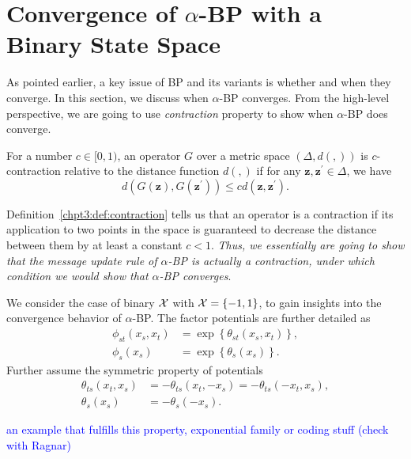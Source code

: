 \section{Convergence of $\alpha$-BP with a Binary State Space}\label{chpt3:sec:cnvg-thm}

As pointed earlier, a key issue of BP and its variants is whether and when they converge. In this section, we discuss when $\alpha$-BP converges. 
From the high-level perspective, we are going to use \textit{contraction} property to show when $\alpha$-BP does converge.
\begin{definition}\label{chpt3:def:contraction}
  For a number $c \in [0,1)$, an operator $G$ over a metric space $(\Delta, d(,))$ is $c$-contraction relative to the distance function $d(,)$ if for any $\bm{z}, \bm{z}^{\prime} \in \Delta$, we have
  \begin{equation}
    d(G(\bm{z}), G(\bm{z}^{\prime})) \leq c d(\bm{z}, \bm{z}^{\prime}).
  \end{equation}
\end{definition}
Definition~\ref{chpt3:def:contraction} tells us that an operator is a contraction if its application to two points in the space is guaranteed to decrease the distance between them by at least a constant $c < 1$. \textit{Thus, we essentially are going to show that the message update rule of $\alpha$-BP is actually a contraction, under which condition we would show that $\alpha$-BP converges}.

We consider the case of binary $\mathcal{X}$ with $\mathcal{X}=\left\{ -1, 1 \right\}$, to gain insights into the convergence behavior of $\alpha$-BP. The factor potentials are further detailed as
\begin{align}
  \phi_{st}(x_s, x_t) &= \exp\left\{ \theta_{st}(x_s, x_t)\right\}, \nonumber \\
  \phi_{s}(x_s) &= \exp\left\{ \theta_{s}(x_s) \right\}.
\end{align}
Further assume the symmetric property of potentials
\begin{align}
  \theta_{ts}(x_t, x_s) &= -\theta_{ts}(x_t, -x_s) = -\theta_{ts}(-x_t, x_s), \nonumber\\
  \theta_{s}(x_s) &= - \theta_s(-x_s).
\end{align}

\begin{example}
\textcolor{blue}{an example that fulfills this property, exponential family or coding stuff (check with Ragnar)}
\end{example}

